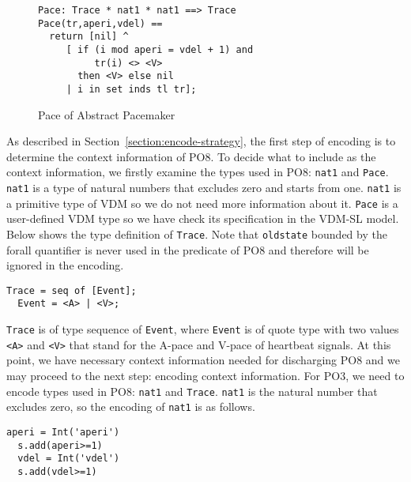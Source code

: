 \begin{figure}[t]
\begin{center}
\begin{mdframed}[roundcorner=5pt]
\begin{Verbatim}[fontsize=\small]
Pace: Trace * nat1 * nat1 ==> Trace
Pace(tr,aperi,vdel) ==
  return [nil] ^
     [ if (i mod aperi = vdel + 1) and
          tr(i) <> <V> 
       then <V> else nil
     | i in set inds tl tr];
\end{Verbatim}
\end{mdframed}
\vspace{-10pt}
\caption{Pace of Abstract Pacemaker}
\label{fig:pace_case1}
\end{center}
\vspace{-20pt}
\end{figure}

As described in Section~\ref{section:encode-strategy}, the first step of encoding is to determine the context information of PO8. To decide what to include as the context information, we firstly examine the types used in PO8: {\tt nat1} and {\tt Pace}. {\tt nat1} is a type of natural numbers that excludes zero and starts from one. {\tt nat1} is a primitive type of VDM so we do not need more information about it. {\tt Pace} is a user-defined VDM type so we have check its specification in the VDM-SL model. Below shows the type definition of {\tt Trace}. Note that {\tt oldstate} bounded by the forall quantifier is never used in the predicate of PO8 and therefore will be ignored in the encoding.

\begin{mdframed}[roundcorner=5pt]
\begin{Verbatim}[fontsize=\small]
  Trace = seq of [Event];
  Event = <A> | <V>;
\end{Verbatim}
\end{mdframed}

{\tt Trace} is of type sequence of {\tt Event}, where {\tt Event} is of quote type with two values {\tt <A>} and {\tt <V>} that stand for the A-pace and V-pace of heartbeat signals. At this point, we have necessary context information needed for discharging PO8 and we may proceed to the next step: encoding context information. For PO3, we need to encode types used in PO8: {\tt nat1} and {\tt Trace}. {\tt nat1} is the natural number that excludes zero, so the encoding of {\tt nat1} is as follows. 

\begin{mdframed}[roundcorner=5pt,shadow=true]
\begin{Verbatim}[fontsize=\small]
  aperi = Int('aperi')
  s.add(aperi>=1)
  vdel = Int('vdel')
  s.add(vdel>=1)
\end{Verbatim}
\end{mdframed}

